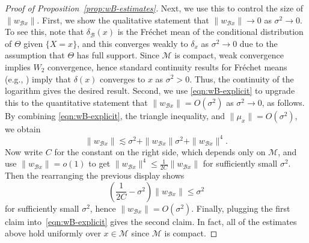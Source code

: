 \documentclass[preprint]{imsart}
\theoremstyle{plain}
\theoremstyle{definition}
\newcommand{\Mcal}{\mathcal{M}}
\newcommand{\B}{\mathcal{B}}
\begin{document}
\begin{appendix}
\begin{proof}[Proof of Proposition~\ref{prop:wB-estimates}]
    Next, we use this to control the size of $\|w_{\B x}\|$.
    First,  we show the qualitative statement that $\|w_{\B x}\|\to 0$ as $\sigma^2\to 0$.
    To see this, note that 
    $\delta_{\B}(x)$ is the Fr\'echet mean of the conditional distribution of $\Theta$ given $\{X=x\}$, and this converges weakly to $\delta_x$ as $\sigma^2\to 0$ due to the assumption that $\Theta$ has full support.
    Since $\Mcal$ is compact, weak convergence implies $W_2$ convergence, hence standard continuity results for Fr\'echet means (e.g., \cite{EvansJaffeSLLN, JaffeInfDim}) imply that $\delta(x)$ converges to $x$ as $\sigma^2>0$.
    Thus, the continuity of the logarithm gives the desired result.
    Second, we use \eqref{eqn:wB-explicit} to upgrade this to the quantitative statement that $\|w_{\B x}\| = O(\sigma^2)$ as $\sigma^2\to 0$, as follows.
    By combining \eqref{eqn:wB-explicit}, the triangle inequality, and $\|\mu_x\| = O(\sigma^2)$, we obtain
    $$
    \|w_{\mathcal B x}\|
    \lesssim
    \sigma^2 + \|w_{\mathcal B x}\|\sigma^2 + \|w_{\mathcal B x}\|^4.
    $$
    Now write $C$ for the constant on the right side, which depends only on $\Mcal$, and use $\|w_{\B x}\| = o(1)$ to get $\|w_{\B x}\|^4 \le \frac{1}{2C}\|w_{\B x}\|$ for sufficiently small $\sigma^2$.
    Then the rearranging the previous display shows
    \begin{equation*}
        \left(\frac{1}{2C}-\sigma^2\right)\|w_{\mathcal B x}\|
    \le
    \sigma^2
    \end{equation*}
    for sufficiently small $\sigma^2$, hence $\|w_{\B x}\| = O(\sigma^2)$.
    Finally, plugging the first claim into~\eqref{eqn:wB-explicit} gives the second claim. In fact, all of the estimates above hold uniformly over $x\in\Mcal$ since $\Mcal$ is compact.    
\end{proof}



\end{appendix}
\end{document}
